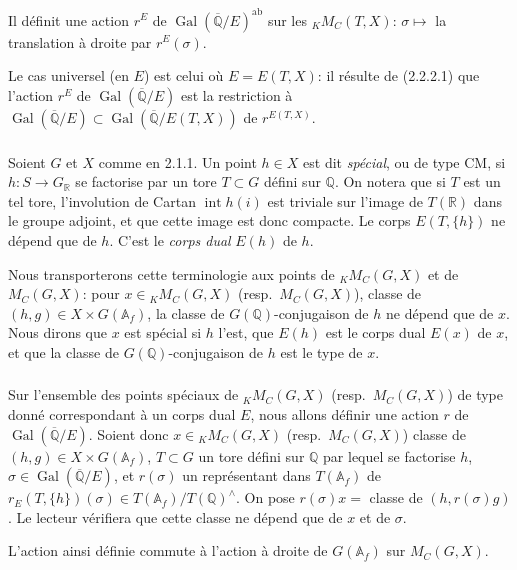\documentclass[12pt,a4paper]{article}
\theoremstyle{plain}
\theoremstyle{definition}
\theoremstyle{remark}
\DeclareMathOperator{\Gal}{Gal}
\DeclareMathOperator{\Int}{int}
\newcommand{\QQ}{\mathbb{Q}}
\newcommand{\RR}{\mathbb{R}}
\newcommand{\Af}{\mathbb{A}_f}
\begin{document}
Il d\'efinit une action $r^E$ de $\Gal(\overline{\QQ}/E)^{\text{ab}}$ sur les ${}_K M_C(T,X)$: $\sigma \mapsto$ la translation \`a droite par $r^E(\sigma)$.

Le cas universel (en $E$) est celui o\`u $E = E(T,X)$: il r\'esulte de (2.2.2.1) que l'action $r^E$ de $\Gal(\overline{\QQ}/E)$ est la restriction \`a $\Gal(\overline{\QQ}/E) \subset \Gal(\overline{\QQ}/E(T,X))$ de $r^{E(T,X)}$.

\subsubsection{}

Soient $G$ et $X$ comme en 2.1.1. Un point $h \in X$ est dit \textit{sp\'ecial}, ou de type CM, si $h:S \to G_{\RR}$ se factorise par un tore $T \subset G$ d\'efini sur $\QQ$. On notera que si $T$ est un tel tore, l'involution de Cartan $\Int h(i)$ est triviale sur l'image de $T(\RR)$ dans le groupe adjoint, et que cette image est donc compacte. Le corps $E(T,\{h\})$ ne d\'epend que de $h$. C'est le \textit{corps dual} $E(h)$ de $h$.

Nous transporterons cette terminologie aux points de ${}_K M_C(G,X)$ et de $M_C(G,X)$: pour $x \in {}_K M_C(G,X)$ (resp.~$M_C(G,X)$), classe de $(h,g) \in X \times G(\Af)$, la classe de $G(\QQ)$-conjugaison de $h$ ne d\'epend que de $x$. Nous dirons que $x$ est sp\'ecial si $h$ l'est, que $E(h)$ est le corps dual $E(x)$ de $x$, et que la classe de $G(\QQ)$-conjugaison de $h$ est le type de $x$.

\subsubsection{}

Sur l'ensemble des points sp\'eciaux de ${}_K M_C(G,X)$ (resp.~$M_C(G,X)$) de type donn\'e correspondant \`a un corps dual $E$, nous allons d\'efinir une action $r$ de $\Gal(\overline{\QQ}/E)$. Soient donc $x \in {}_K M_C(G,X)$ (resp.~$M_C(G,X)$) classe de $(h,g) \in X \times G(\Af)$, $T \subset G$ un tore d\'efini sur $\QQ$ par lequel se factorise $h$, $\sigma \in \Gal(\overline{\QQ}/E)$, et $r(\sigma)$ un repr\'esentant dans $T(\Af)$ de $r_E(T,\{h\})(\sigma) \in T(\Af)/T(\QQ)^{\wedge}$. On pose $r(\sigma)x =$ classe de $(h, r(\sigma)g)$. Le lecteur v\'erifiera que cette classe ne d\'epend que de $x$ et de $\sigma$.

L'action ainsi d\'efinie commute \`a l'action \`a droite de $G(\Af)$ sur $M_C(G,X)$.
\end{document}
